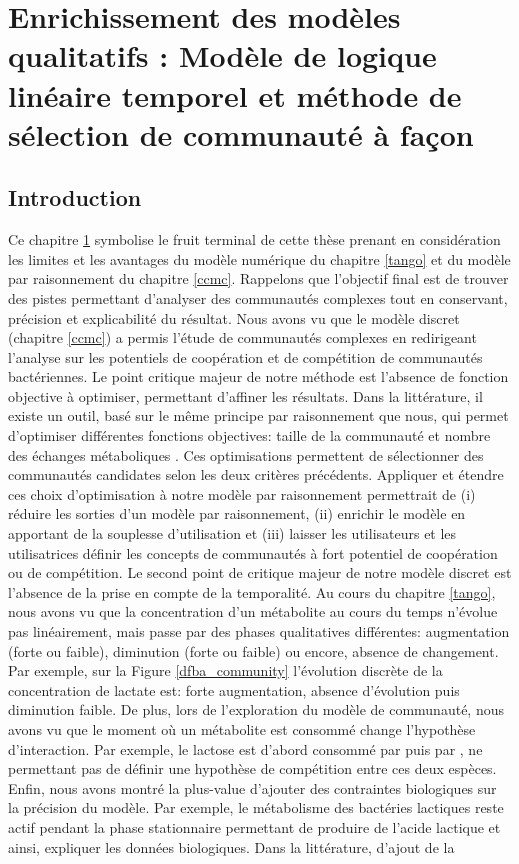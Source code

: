 \documentclass[../main.tex]{subfiles}
\begin{document}
\chapter{Enrichissement des modèles qualitatifs : Modèle de logique linéaire temporel et méthode de sélection de communauté à façon }
\label{enrichissement}
\minitoc
\newpage


\section{Introduction}
Ce chapitre \ref{enrichissement} symbolise le fruit terminal de cette thèse prenant en considération les limites et les avantages du modèle numérique du chapitre \ref{tango} et du modèle par raisonnement du chapitre \ref{ccmc}. Rappelons que l'objectif final est de trouver des pistes permettant d'analyser des communautés complexes tout en conservant, précision et explicabilité du résultat. Nous avons vu que le modèle discret (chapitre \ref{ccmc})  a permis l'étude de communautés complexes en redirigeant l'analyse sur les potentiels de coopération et de compétition de communautés bactériennes. Le point critique majeur de notre méthode est l'absence de fonction objective à optimiser, permettant d'affiner les résultats. Dans la littérature, il existe un outil, basé sur le même principe par raisonnement que nous, qui permet d'optimiser différentes fonctions objectives: taille de la communauté et nombre des échanges métaboliques \citep{Frioux2018}. Ces optimisations permettent de sélectionner des communautés candidates selon les deux critères précédents. Appliquer et étendre ces choix d'optimisation à notre modèle par raisonnement permettrait de (i) réduire les sorties d'un modèle par raisonnement, (ii) enrichir le modèle en apportant de la souplesse d'utilisation et (iii) laisser les utilisateurs et les utilisatrices définir les concepts de communautés à fort potentiel de coopération ou de compétition. Le second point de critique majeur de notre modèle discret est l'absence de la prise en compte de la temporalité. Au cours du chapitre \ref{tango}, nous avons vu que la concentration d'un métabolite au cours du temps n'évolue pas linéairement, mais passe par des phases qualitatives différentes: augmentation (forte ou faible), diminution (forte ou faible) ou encore, absence de changement. Par exemple, sur la Figure \ref{dfba_community} l'évolution discrète de la concentration de lactate est: forte augmentation, absence d'évolution puis diminution faible. De plus, lors de l'exploration du modèle de communauté, nous avons vu que le moment où un métabolite est consommé change l'hypothèse d'interaction. Par exemple, le lactose est d'abord consommé par \lactis puis par \freud, ne permettant pas de définir une hypothèse de compétition entre ces deux espèces. Enfin, nous avons montré la plus-value d'ajouter des contraintes biologiques sur la précision du modèle. Par exemple, le métabolisme des bactéries lactiques reste actif pendant la phase stationnaire permettant de produire de l'acide lactique et ainsi, expliquer les données biologiques. Dans la littérature, d'ajout de la 
\end{document}
